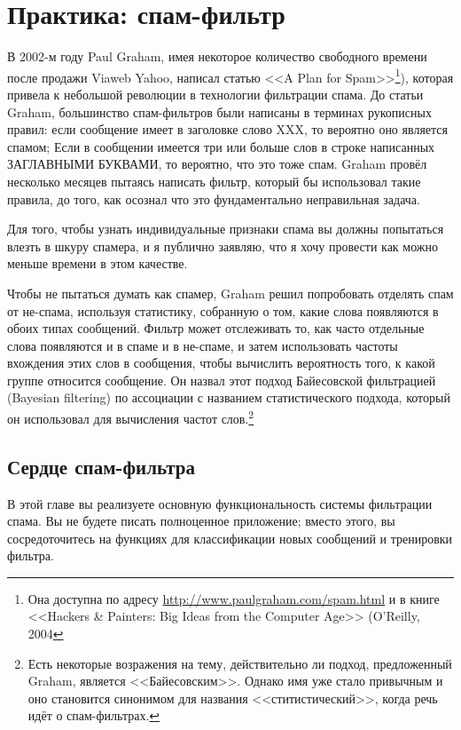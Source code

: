 \chapter{Практика: спам-фильтр}
\label{ch:23}

В 2002-м году Paul Graham, имея некоторое количество свободного времени после продажи
Viaweb Yahoo, написал статью <<A Plan for Spam>>\footnote{Она доступна по адресу
  \url{http://www.paulgraham.com/spam.html} и в книге <<Hackers \& Painters: Big Ideas from
  the Computer Age>> (O'Reilly, 2004}), которая привела к небольшой революции в технологии
фильтрации спама.  До статьи Graham, большинство спам-фильтров были написаны в терминах
рукописных правил: если сообщение имеет в заголовке слово XXX, то вероятно оно является
спамом; Если в сообщении имеется три или больше слов в строке написанных ЗАГЛАВНЫМИ
БУКВАМИ, то вероятно, что это тоже спам. Graham провёл несколько месяцев пытаясь написать
фильтр, который бы использовал такие правила, до того, как осознал что это фундаментально
неправильная задача.

Для того, чтобы узнать индивидуальные признаки спама вы должны попытаться влезть в шкуру
спамера, и я публично заявляю, что я хочу провести как можно меньше времени в этом
качестве.

Чтобы не пытаться думать как спамер, Graham решил попробовать отделять спам от не-спама,
используя статистику, собранную о том, какие слова появляются в обоих типах сообщений.
Фильтр может отслеживать то, как часто отдельные слова появляются и в спаме и в не-спаме,
и затем использовать частоты вхождения этих слов в сообщения, чтобы вычислить вероятность
того, к какой группе относится сообщение.  Он назвал этот подход Байесовской фильтрацией
(Bayesian filtering) по ассоциации с названием статистического подхода, который он
использовал для вычисления частот слов.\footnote{Есть некоторые возражения на тему,
  действительно ли подход, предложенный Graham, является <<Байесовским>>.  Однако имя уже
  стало привычным и оно становится синонимом для названия <<ститистический>>, когда речь
  идёт о спам-фильтрах.}

\section{Сердце спам-фильтра}

В этой главе вы реализуете основную функциональность системы фильтрации спама.  Вы не
будете писать полноценное приложение; вместо этого, вы сосредоточитесь на функциях для
классификации новых сообщений и тренировки фильтра.

